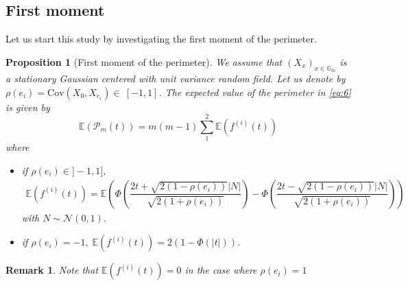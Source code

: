 \documentclass[12pt]{article}
\theoremstyle{Theorem}
\newtheorem{Proposition}[Theorem]{Proposition}
\newtheorem{remark}{Remark}
\begin{document}
\subsection{First moment}
Let us start this study by investigating the first moment of the perimeter.
\begin{Proposition}[First moment of the perimeter] 
\label{propFisrtmoment}
We assume that $\left(X_x \right)_{x \in \mathbb{G}_{m}}$ is a stationary Gaussian centered with unit variance random field. Let us denote \linebreak by  $\rho(e_i) = \text{Cov}\left(X_{\scriptscriptstyle 0}, X_{e_i}\right) \in~[-1, 1]$. The expected value of the perimeter in \eqref{eq:6} is  given \linebreak by $$\mathbb{E}\left(\mathcal{P}_{m}(t)\right) = m(m-1)\sum_{1}^{2}\mathbb{E}\left(f^{(i)}(t) \right)$$ where
\begin{itemize}
  \item if $\rho(e_{i}) \in ]-1,1]$, 
    {\small
  \begin{align}
  \label{propEquationFisrtmoment}
  \mathbb{E}\left(f^{(i)}(t) \right) = \mathbb{E}\left(\Phi\left(\dfrac{2t + \sqrt{2(1-\rho(e_i))}|N|}{\sqrt{2(1+\rho(e_i))}}\right)  - \Phi\left(\dfrac{2t - \sqrt{2(1-\rho(e_i))}|N|}{\sqrt{2(1+\rho(e_i))}}\right)\right)
  \end{align}}
with $N \sim \mathcal{N}(0,1)$. 
\item if $\rho(e_i) = -1, \; \mathbb{E}\left(f^{(i)}(t) \right)= 2\left(1 - \Phi\left(|t|\right)\right).$
  \end{itemize}
\end{Proposition}
\begin{remark}
Note that $\mathbb{E}\left(f^{(i)}(t) \right) = 0$ in the case where $\rho(e_i) = 1$ 
\end{remark}
\end{document}
